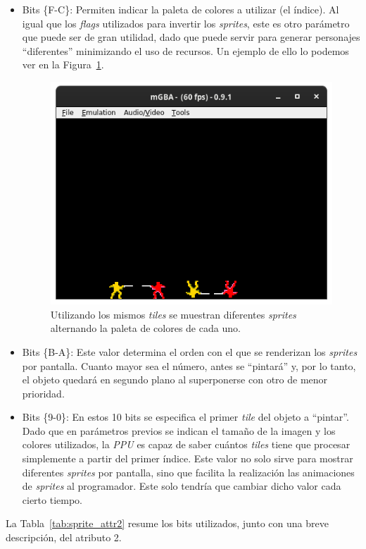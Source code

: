 \begin{itemize}
	\item Bits \{F-C\}: Permiten indicar la paleta de colores a utilizar (el índice). Al igual que los \textit{flags} utilizados para invertir los \textit{sprites}, este es otro parámetro que puede ser de gran utilidad, dado que puede servir para generar personajes ``diferentes'' minimizando el uso de recursos. Un ejemplo de ello lo podemos ver en la Figura~\ref{fig:sprite_pal}.

		\begin{figure}[h]
			\centering
			\includegraphics[width=.5\textwidth]{capitulos/capitulo3/sprite_pal.png}
			\caption{Utilizando los mismos \textit{tiles} se muestran diferentes \textit{sprites} alternando la paleta de colores de cada uno.}
			\label{fig:sprite_pal}
		\end{figure}
		\FloatBarrier

	\item Bits \{B-A\}: Este valor determina el orden con el que se renderizan los \textit{sprites} por pantalla. Cuanto mayor sea el número, antes se ``pintará'' y, por lo tanto, el objeto quedará en segundo plano al superponerse con otro de menor prioridad.
	\item Bits \{9-0\}: En estos 10 bits se especifica el primer \textit{tile} del objeto a ``pintar''. Dado que en parámetros previos se indican el tamaño de la imagen y los colores utilizados, la \textit{PPU} es capaz de saber cuántos \textit{tiles} tiene que procesar simplemente a partir del primer índice. Este valor no solo sirve para mostrar diferentes \textit{sprites} por pantalla, sino que facilita la realización las animaciones de \textit{sprites} al programador. Este solo tendría que cambiar dicho valor cada cierto tiempo.

\end{itemize}

La Tabla~\ref{tab:sprite_attr2} resume los bits utilizados, junto con una breve descripción, del atributo 2.


